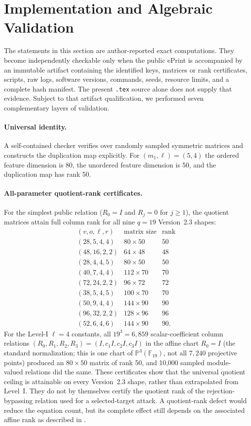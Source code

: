 \documentclass[11pt]{article}
\newcommand{\F}{\mathbb F}
\begin{document}
\section{Implementation and Algebraic Validation}\label{sec:validation}

The statements in this section are author-reported exact computations.  They
become independently checkable only when the public ePrint is accompanied by an
immutable artifact containing the identified keys, matrices or rank
certificates, scripts, raw logs, software versions, commands, seeds, resource
limits, and a complete hash manifest.  The present \texttt{.tex} source alone
does not supply that evidence.  Subject to that artifact qualification, we
performed seven complementary layers of validation.

\paragraph{Universal identity.}
A self-contained checker verifies  over randomly sampled symmetric matrices and constructs the duplication map explicitly.  For $(m_1,\ell)=(5,4)$ the ordered feature dimension is 80, the unordered feature dimension is 50, and the duplication map has rank 50.

\paragraph{All-parameter quotient-rank certificates.}
For the simplest public relation ($R_0=I$ and $R_j=0$ for $j\ge1$), the quotient matrices attain full
column rank for all nine $q=19$ Version~2.3 shapes:
\[
\begin{array}{c|c|c}
(v,o,\ell,r)&\text{matrix size}&\text{rank}\\\hline
(28,5,4,4)&80\times50&50\\
(48,16,2,2)&64\times48&48\\
(28,4,4,5)&80\times50&50\\
(40,7,4,4)&112\times70&70\\
(72,24,2,2)&96\times72&72\\
(38,5,4,5)&100\times70&70\\
(50,9,4,4)&144\times90&90\\
(96,32,2,2)&128\times96&96\\
(52,6,4,6)&144\times90&90.
\end{array}
\]
For the Level-I $\ell=4$ constants, all $19^3=6{,}859$
scalar-coefficient column relations $(R_0,R_1,R_2,R_3)=(I,c_1I,c_2I,c_3I)$ in
the affine chart $R_0=I$ (the standard normalization; this is one chart of
$\mathbb P^3(\F_{19})$, not all $7{,}240$ projective points) produced an
$80\times50$ matrix of rank 50, and 10,000 sampled module-valued relations did
the same.  These certificates show that the universal quotient ceiling is attainable on
every Version~2.3 shape, rather than extrapolated from Level~I.  They do not by
themselves certify the quotient rank of the rejection-bypassing relation used
for a selected-target attack.  A quotient-rank defect would reduce the equation
count, but its complete effect still depends on the associated affine rank as
described in .
\end{document}
